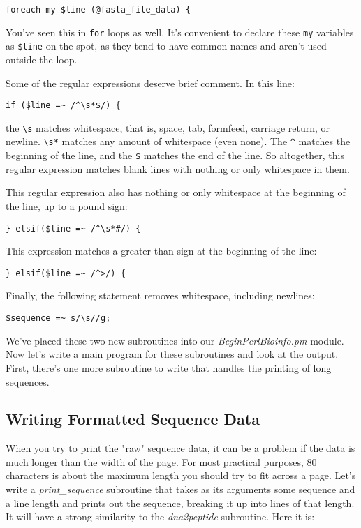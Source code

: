 \begin{lstlisting}
foreach my $line (@fasta_file_data) {
\end{lstlisting}

You've seen this in \verb|for| loops as well. It's convenient to declare these \verb|my| variables as \verb|$line| on the spot, as they tend to have common names and aren't used outside the loop.

Some of the regular expressions deserve brief comment. In this line: 

\begin{lstlisting}
if ($line =~ /^\s*$/) {
\end{lstlisting}

the \verb|\s| matches whitespace, that is, space, tab, formfeed, carriage return, or newline. \verb|\s*| matches any amount of whitespace (even none).  The \verb|^| matches the beginning of the line, and the \verb|$| matches the end of the line. So altogether, this regular expression matches blank lines with nothing or only whitespace in them.

This regular expression also has nothing or only whitespace at the beginning of the line, up to a pound sign:

\begin{lstlisting}
} elsif($line =~ /^\s*#/) {
\end{lstlisting}

This expression matches a greater-than sign at the beginning of the line:

\begin{lstlisting}
} elsif($line =~ /^>/) {
\end{lstlisting}

Finally, the following statement removes whitespace, including newlines:

\begin{lstlisting}
$sequence =~ s/\s//g;
\end{lstlisting}

We've placed these two new subroutines into our \textit{BeginPerlBioinfo.pm} module. Now let's write a main program for these subroutines and look at the output. First, there's one more subroutine to write that handles the printing of long sequences. 

\subsection{Writing Formatted Sequence Data}
When you try to print the "raw" sequence data, it can be a problem if the data is much longer than the width of the page. For most practical purposes, 80 characters is about the maximum length you should try to fit across a page. Let's write a \textit{print\_sequence} subroutine that takes as its arguments some sequence and a line length and prints out the sequence, breaking it up into lines of that length. It will have a strong similarity to the \textit{dna2peptide} subroutine. Here it is: 

